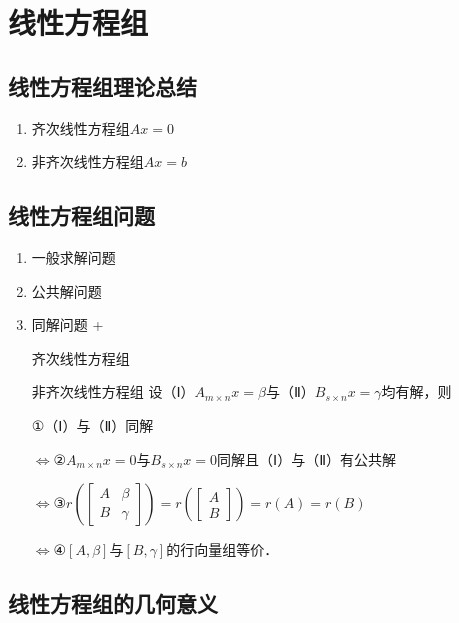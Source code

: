 \chapter{线性方程组}
\section{线性方程组理论总结}
\DOne
\begin{enumerate}
    \item 齐次线性方程组$Ax=0$ \DOne
    \item 非齐次线性方程组$Ax=b$ \DOne
\end{enumerate}


\section{线性方程组问题}
\begin{enumerate}
    \item 一般求解问题
    \item 公共解问题
    \item 同解问题
          \DOne+\DTwoTwo
          \begin{detail}{齐次线性方程组\DTwoTwo}{}
          \end{detail}

          \begin{detail}{非齐次线性方程组\DTwoTwo}{}
              设（\RomanSymbols Ⅰ）$A_{m\times n}x=\beta$与（Ⅱ）$B_{s\times n}x=\gamma$均有解，则

              ①（\RomanSymbols Ⅰ）与（Ⅱ）同解

              $\Leftrightarrow$②$A_{m\times n}x=0$与$B_{s\times n}x=0$同解且（\RomanSymbols Ⅰ）与（Ⅱ）有公共解

              $\Leftrightarrow$③$r\left(\begin{bmatrix}A & \beta \\ B & \gamma\end{bmatrix}\right)=r\left(\begin{bmatrix}A \\ B\end{bmatrix}\right)=r(A)=r(B)$

              $\Leftrightarrow$④$[A,\beta]$与$[B,\gamma]$的行向量组等价．
          \end{detail}
\end{enumerate}


\section{线性方程组的几何意义}


